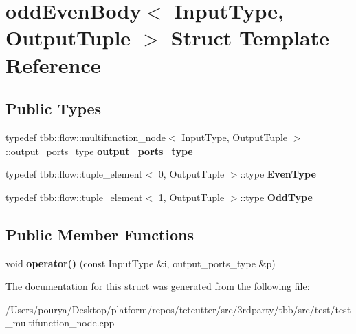 \hypertarget{structoddEvenBody}{}\section{odd\+Even\+Body$<$ Input\+Type, Output\+Tuple $>$ Struct Template Reference}
\label{structoddEvenBody}
\subsection*{Public Types}
\begin{DoxyCompactItemize}
\item 
\hypertarget{structoddEvenBody_a0b5f395341931c87471f711de2fde99b}{}typedef tbb\+::flow\+::multifunction\+\_\+node$<$ Input\+Type, Output\+Tuple $>$\+::output\+\_\+ports\+\_\+type {\bfseries output\+\_\+ports\+\_\+type}\label{structoddEvenBody_a0b5f395341931c87471f711de2fde99b}

\item 
\hypertarget{structoddEvenBody_afbdfdf6ea6704da2ca20c943d54fced7}{}typedef tbb\+::flow\+::tuple\+\_\+element$<$ 0, Output\+Tuple $>$\+::type {\bfseries Even\+Type}\label{structoddEvenBody_afbdfdf6ea6704da2ca20c943d54fced7}

\item 
\hypertarget{structoddEvenBody_a2d845b9ecccd3c69612a6aa4bb99effd}{}typedef tbb\+::flow\+::tuple\+\_\+element$<$ 1, Output\+Tuple $>$\+::type {\bfseries Odd\+Type}\label{structoddEvenBody_a2d845b9ecccd3c69612a6aa4bb99effd}

\end{DoxyCompactItemize}
\subsection*{Public Member Functions}
\begin{DoxyCompactItemize}
\item 
\hypertarget{structoddEvenBody_a3daf978d435845bc7bfaf6d75caaaef6}{}void {\bfseries operator()} (const Input\+Type \&i, output\+\_\+ports\+\_\+type \&p)\label{structoddEvenBody_a3daf978d435845bc7bfaf6d75caaaef6}

\end{DoxyCompactItemize}


The documentation for this struct was generated from the following file\+:\begin{DoxyCompactItemize}
\item 
/\+Users/pourya/\+Desktop/platform/repos/tetcutter/src/3rdparty/tbb/src/test/test\+\_\+multifunction\+\_\+node.\+cpp\end{DoxyCompactItemize}
